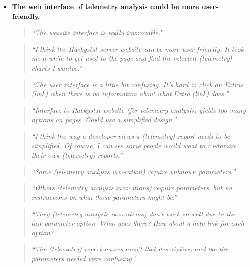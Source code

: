 \begin{itemize}
  \item \textbf{The web interface of telemetry analysis could be more user-friendly.}
    \begin{quote} \textit{``The website interface is really improvable.''} \end{quote}
    \begin{quote} \textit{``I think the Hackystat server website can be more user
           friendly. It took me a while to get used to the page and find the 
           relevant (telemetry) charts I wanted.''} \end{quote}  
    \begin{quote} \textit{``The user interface is a little bit confusing. 
           It's hard to click on Extras (link) when there is no information about 
           what Extra (link) does.''} \end{quote}
    \begin{quote} \textit{``Interface to Hackystat website 
          (for telemetry analysis) yields too many options on pages. 
           Could use a simplified design.''} \end{quote}
    \begin{quote} \textit{``I think the way a developer views a (telemetry) report 
           needs to be simplified. Of course, I can see some people would want to
           customize their own (telemetry) reports.''} \end{quote}  
    \begin{quote} \textit{``Some (telemetry analysis invocation) require 
           unknown parameters.''} \end{quote}
    \begin{quote} \textit{``Others (telemetry analysis invocations) require 
           parameters, but no instructions on what those parameters 
           might be.''} \end{quote}
    \begin{quote} \textit{``They (telemetry analysis invocations) don't work 
           so well due to the last parameter option. What goes there? 
           How about a help link for each option?''} \end{quote}  
    \begin{quote} \textit{``The (telemetry) report names aren't that descriptive, 
           and the the parameters needed were confusing.''} \end{quote}




\end{itemize}
